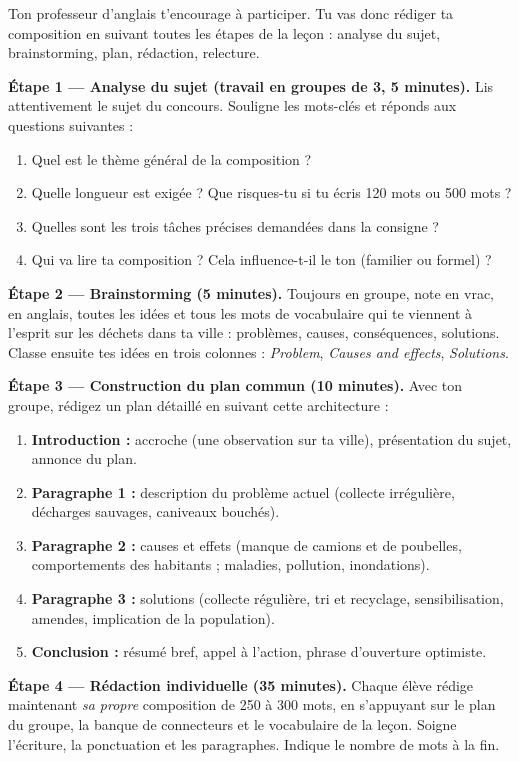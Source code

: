 \documentclass[11pt]{article}
\newcounter{popsec}
\newcounter{popsub}
\newcommand{\courssub}[1]{%
  \stepcounter{popsub}%
  \par\vspace{9pt}\noindent{\popxbold\fontsize{11.5}{13}\selectfont\color{popink}{\color{poporange}\thepopsec.\thepopsub}\hspace{6pt}#1}\par\nopagebreak\vspace{4pt}
}
\begin{document}
Ton professeur d'anglais t'encourage à participer. Tu vas donc rédiger ta composition en suivant toutes les étapes de la leçon : analyse du sujet, brainstorming, plan, rédaction, relecture.

\courssub{Consignes}

\textbf{Étape 1 — Analyse du sujet (travail en groupes de 3, 5 minutes).}
Lis attentivement le sujet du concours. Souligne les mots-clés et réponds aux questions suivantes :
\begin{enumerate}
\item Quel est le thème général de la composition ?
\item Quelle longueur est exigée ? Que risques-tu si tu écris 120 mots ou 500 mots ?
\item Quelles sont les trois tâches précises demandées dans la consigne ?
\item Qui va lire ta composition ? Cela influence-t-il le ton (familier ou formel) ?
\end{enumerate}

\textbf{Étape 2 — Brainstorming (5 minutes).}
Toujours en groupe, note en vrac, en anglais, toutes les idées et tous les mots de vocabulaire qui te viennent à l'esprit sur les déchets dans ta ville : problèmes, causes, conséquences, solutions. Classe ensuite tes idées en trois colonnes : \emph{Problem}, \emph{Causes and effects}, \emph{Solutions}.

\textbf{Étape 3 — Construction du plan commun (10 minutes).}
Avec ton groupe, rédigez un plan détaillé en suivant cette architecture :
\begin{enumerate}
\item \textbf{Introduction :} accroche (une observation sur ta ville), présentation du sujet, annonce du plan.
\item \textbf{Paragraphe 1 :} description du problème actuel (collecte irrégulière, décharges sauvages, caniveaux bouchés).
\item \textbf{Paragraphe 2 :} causes et effets (manque de camions et de poubelles, comportements des habitants ; maladies, pollution, inondations).
\item \textbf{Paragraphe 3 :} solutions (collecte régulière, tri et recyclage, sensibilisation, amendes, implication de la population).
\item \textbf{Conclusion :} résumé bref, appel à l'action, phrase d'ouverture optimiste.
\end{enumerate}

\textbf{Étape 4 — Rédaction individuelle (35 minutes).}
Chaque élève rédige maintenant \emph{sa propre} composition de 250 à 300 mots, en s'appuyant sur le plan du groupe, la banque de connecteurs et le vocabulaire de la leçon. Soigne l'écriture, la ponctuation et les paragraphes. Indique le nombre de mots à la fin.
\end{document}
